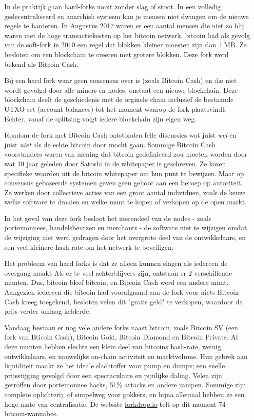 In de praktijk gaan hard-forks nooit zonder slag of stoot. In een volledig gedecentraliseerd en anarchish systeem kan je mensen niet dwingen om de nieuwe regels te hanteren. In Augustus 2017 waren er een aantal mensen die niet zo blij waren met de hoge transactiekosten op het bitcoin netwerk. bitcoin had als gevolg van de soft-fork in 2010 een regel dat blokken kleiner moesten zijn dan 1 MB. Ze besloten om een blockchain te creëren met grotere blokken. Deze fork werd bekend als Bitcoin Cash.  

Bij een hard fork waar geen consensus over is (zoals Bitcoin Cash) en die niet wordt gevolgd door alle miners en nodes, onstaat een nieuwe blockchain. Deze blockchain deelt de geschiedenis met de orginele chain inclusief de bestaande UTXO set (account balances) tot het moment waarop de fork plaatsvindt. Echter, vanaf de splitsing volgt iedere blockchain zijn eigen weg. 

Rondom de fork met Bitcoin Cash ontstonden felle discussies wat juist \textit{wel} en juist \textit{niet} als de echte bitcoin door mocht gaan. Sommige Bitcoin Cash voorstanders waren van mening dat bitcoin gedefinieerd zou moeten worden door wat 10 jaar geleden door Satoshi in de whitepaper is geschreven. Ze kozen specifieke woorden uit de bitcoin whitepaper om hun punt te bewijzen. Maar op consensus gebaseerde systemen geven geen gehoor aan een beroep op autoriteit. Ze werken door collectieve acties van een groot aantal individuen, zoals de keuze welke software te draaien en welke munt te kopen of verkopen op de open markt.

In het geval van deze fork besloot het merendeel van de nodes - zoals portemonnees, handelsbeurzen en merchants - de software niet te wijzigen omdat de wijziging niet werd gedragen door het overgrote deel van de ontwikkelaars, en een veel kleinere hash-rate om het netwerk te beveiligen. 

Het probleem van hard forks is dat ze alleen kunnen slagen als iedereen de overgang maakt Als er te veel achterblijvers zijn, ontstaan er 2 verschillende munten. Dus, bitcoin bleef bitcoin, en Bitcoin Cash werd een andere munt. Aangezien iedereen die bitcoin had voorafgaand aan de fork voor niets Bitcoin Cash kreeg toegekend, besloten velen dit "gratis geld" te verkopen, waardoor de prijs verder omlaag kelderde.

Vandaag bestaan er nog vele andere forks naast bitcoin, zoals Bitcoin SV (een fork van Bticoin Cash), Bitcoin Gold, Bitcoin Diamond en Bitcoin Private. Al deze munten hebben slechts een klein deel van bitcoins hash-rate, weinig ontwikkelaars, en nauwelijks on-chain activiteit en marktvolume. Hun gebrek aan liquiditeit maakt ze het ideale slachtoffer voor pump en dumps; een snelle prijsstijging gevolgd door een spectaculaire en pijnlijke daling. Velen zijn getroffen door portemonnee hacks, 51\% attacks en andere rampen. Sommige zijn complete oplichterij, of simpelweg voor gokkers, en bijna allemaal hebben ze een hoge mate van centralisatie. De website \href{https://forkdrop.io/}{forkdrop.io} telt op dit moment 74 bitcoin-wannabes.

